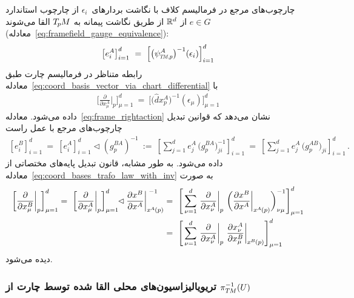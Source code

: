 چارچوب‌های مرجع در فرمالیسم کلاف با نگاشت بردارهای~$\epsilon_i$ از چارچوب استاندارد $e\in G$ از $\mathbb{R}^d$ از طریق نگاشت پیمانه به $T_{\mkern-1.5mu p}\mkern-.5muM$ القا می‌شوند (معادله~\ref{eq:framefield_gauge_equivalence}):
\begin{align}
	\big[ e_i^A \big]_{i=1}^d\ =\ \Big[ \big(\psiTMp^A \big)^{-1} (\epsilon_i) \Big]_{i=1}^d
\end{align}
رابطه متناظر در فرمالیسم چارت طبق معادله~\eqref{eq:coord_basis_vector_via_chart_differential} با 
\begin{align}
	\bigg[ \frac{\partial}{\partial x^A_\mu} \bigg|_p \bigg]_{\mu=1}^d\ =\ \Big[ \big(\hat{d}x_p^A \big)^{-1} (\epsilon_\mu) \Big]_{\mu=1}^d
\end{align}
داده می‌شود. معادله~\eqref{eq:frame_rightaction} نشان می‌دهد که قوانین تبدیل چارچوب‌های مرجع با عمل راست
\begin{align}\label{eq:trafo_law_comparison_basis_gauge}
	\left[e_{i}^B\right]_{i=1}^d
	\  =\ \left[ e_{i}^A \right]_{i=1}^d \!\lhd \left(g_p^{BA}\right)^{-1}
	\ :=\ \left[ \sum\nolimits_{j=1}^d e_{j}^A\, \big(g_p^{BA}\big)^{-1}_{ji} \right]_{i=1}^d
	\ =\ \left[ \sum\nolimits_{j=1}^d e_{j}^A\, \big(g_p^{AB}\big)_{ji} \right]_{i=1}^d \,.
\end{align}
داده می‌شود. به طور مشابه، قانون تبدیل پایه‌های مختصاتی از معادله~\eqref{eq:coord_bases_trafo_law_with_inv} به صورت
\begin{align}\label{eq:trafo_law_comparison_basis_chart}
	\bigg[\frac{\partial}{\partial x^B_\mu} \bigg|_p \bigg]_{\mu=1}^d
	=\ \bigg[\frac{\partial}{\partial x^A_\mu} \bigg|_p \bigg]_{\mu=1}^d \mkern-6mu\lhd \frac{\partial x^B}{\partial x^A} \bigg|_{x^{\mkern-1muA}\mkern-1mu(p)}^{\;-1}
	&=\ \Bigg[ \sum_{\nu=1}^d \,
	\frac{\partial        }{\partial x^A_\nu} \bigg|_p \ 
	\bigg( \frac{\partial x^B}{\partial x^A} \bigg|_{x^{\mkern-1muA}\mkern-1mu(p)} \bigg)^{-1}_{\nu\mu}
	\Bigg]_{\mu=1}^d 
	\notag \\
	&=\ \Bigg[ \sum_{\nu=1}^d \,
	\frac{\partial        }{\partial x^A_\nu} \bigg|_p \ 
	\frac{\partial x^A_\nu}{\partial x^B_\mu} \bigg|_{x^{\mkern-1muB}\mkern-1mu(p)}
	\Bigg]_{\mu=1}^d 
\end{align}
دیده می‌شود.











\subsubsection[تریویالیزاسیون‌های محلی القا شده توسط چارت از \texorpdfstring{$ \pi_{\TM}^{-1}(U) $}{TU}]%
{تریویالیزاسیون‌های محلی القا شده توسط چارت از \texorpdfstring{$\pi_{\TM}^{-1}(U)$}{TU}}
\label{apx:correspondences_chart_gauge_local}

